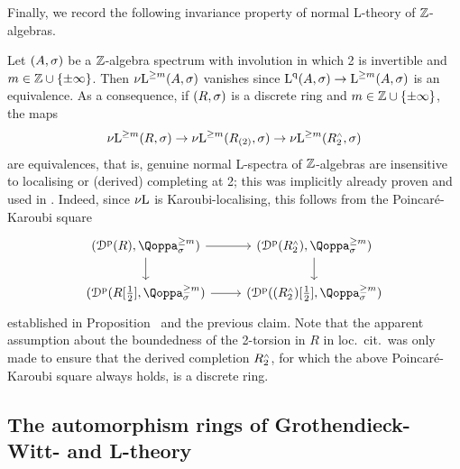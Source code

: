Finally, we record the following invariance property of normal L-theory of $\mathbb{Z}$-algebras.
\begin{example}
Let $(A,\sigma)$ be a $\mathbb{Z}$-algebra spectrum with involution in which 2 is invertible and $m\in \mathbb{Z} \cup \{\pm \infty \}$. Then ${\nu\!\operatorname L}^{\geq m}(A,\sigma)$ vanishes since $\operatorname L^{\mathrm{q}}(A,\sigma) \to \operatorname L^{\geq m}(A,\sigma)$ is an equivalence. As a consequence, if $(R,\sigma)$ is a discrete ring and $m\in \mathbb{Z} \cup \{\pm \infty \}$, the maps 
\[
{\nu\!\operatorname L}^{\geq m}(R,\sigma) \to {\nu\!\operatorname L}^{\geq m}(R_{(2)},\sigma) \to {\nu\!\operatorname L}^{\geq m}(R_2^{\scriptscriptstyle\wedge},\sigma)
\]
are equivalences, that is, genuine normal L-spectra of $\mathbb{Z}$-algebras are insensitive to localising or (derived) completing at 2; this was implicitly already proven and used in \paperthree. Indeed, since ${\nu\!\operatorname L}$ is Karoubi-localising, this follows from the Poincar\'e-Karoubi square
\[
\begin{tikzcd}
	(\Dperf(R),\QF^{\geq m}_\sig) \ar[r] \ar[d] & (\Dperf(R_2^\cwedge),\QF^{\geq m}_\sig) \ar[d] \\
	(\Dperf(R[\tfrac{1}{2}],\QF^{\geq m}_\sig) \ar[r] & (\Dperf((R_2^\cwedge)[\tfrac{1}{2}],\QF^{\geq m}_{\sig})
\end{tikzcd}
\]
established in Proposition~ and the previous claim. Note that the apparent assumption about the boundedness of the 2-torsion in $R$ in loc.\ cit.\ was only made to ensure that the derived completion $R^{\scriptscriptstyle\wedge}_2$, for which the above Poincar\'e-Karoubi square always holds, is a discrete ring.
\end{example}












\subsection{The automorphism rings of Grothendieck-Witt- and L-theory}
\label{subsection:automorphism-GW-L}%


